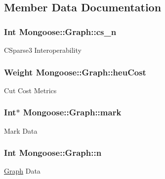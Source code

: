\subsection{Member Data Documentation}
\subsubsection[{\texorpdfstring{cs\+\_\+n}{cs_n}}]{\setlength{\rightskip}{0pt plus 5cm}Int Mongoose\+::\+Graph\+::cs\+\_\+n}\hypertarget{class_mongoose_1_1_graph_a83cb71d4acb332e402220e2899667da0}{}\label{class_mongoose_1_1_graph_a83cb71d4acb332e402220e2899667da0}
C\+Sparse3 Interoperability 
\subsubsection[{\texorpdfstring{heu\+Cost}{heuCost}}]{\setlength{\rightskip}{0pt plus 5cm}Weight Mongoose\+::\+Graph\+::heu\+Cost}\hypertarget{class_mongoose_1_1_graph_ae4a5a338b693910d94884ff817cfc5de}{}\label{class_mongoose_1_1_graph_ae4a5a338b693910d94884ff817cfc5de}
Cut Cost Metrics 
\subsubsection[{\texorpdfstring{mark}{mark}}]{\setlength{\rightskip}{0pt plus 5cm}Int$\ast$ Mongoose\+::\+Graph\+::mark}\hypertarget{class_mongoose_1_1_graph_a09b695589f11535afebda107c703cb4e}{}\label{class_mongoose_1_1_graph_a09b695589f11535afebda107c703cb4e}
Mark Data 
\subsubsection[{\texorpdfstring{n}{n}}]{\setlength{\rightskip}{0pt plus 5cm}Int Mongoose\+::\+Graph\+::n}\hypertarget{class_mongoose_1_1_graph_a93aec4ec3102b46598f64438e19e1867}{}\label{class_mongoose_1_1_graph_a93aec4ec3102b46598f64438e19e1867}
\hyperlink{class_mongoose_1_1_graph}{Graph} Data 
